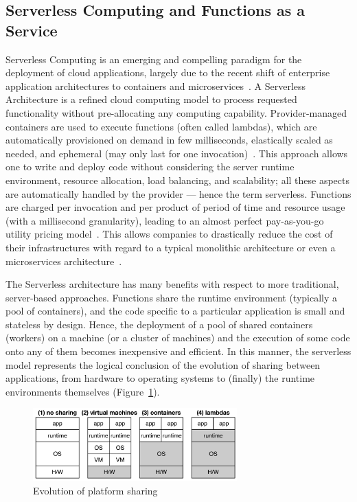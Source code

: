 \subsection{Serverless Computing and Functions as a Service}

Serverless Computing is an emerging and compelling paradigm for the deployment of cloud applications, largely due to the recent shift of enterprise application architectures to containers and microservices~\cite{baldini2017serverless}.  A Serverless Architecture is a refined cloud computing model to process requested functionality without pre-allocating any computing capability. Provider-managed containers are used to execute functions (often called lambdas), which are automatically provisioned on demand in few milliseconds, elastically scaled as needed, and ephemeral (may only last for one invocation)~\cite{Roberts:2016}. This approach allows one to write and deploy code without considering the server runtime
environment, resource allocation, load balancing, and scalability; all these aspects are automatically handled by the provider --- hence the term serverless. Functions are charged per invocation and per product of period of time and resource usage (with a millisecond granularity), leading to an almost perfect pay-as-you-go utility pricing model~\cite{MateosFaaster17}.  This allows companies to drastically reduce the cost of their infrastructures with regard to a typical monolithic architecture or even a microservices architecture~\cite{Villamizar2017lambda}.

The Serverless architecture has many benefits with respect to more traditional, server-based approaches. Functions share the runtime environment (typically a pool of containers), and the code specific to a particular application is small and stateless by design. Hence, the deployment of a pool of shared containers (workers) on a machine (or a cluster of machines) and the execution of some code onto any of them becomes inexpensive and efficient. In this manner, the serverless model represents the logical conclusion of the evolution of sharing between applications, from hardware to operating systems to (finally) the runtime environments themselves (Figure~\ref{fig:Evolution-of-Sharing}).

\begin{figure}
  \centering
    \includegraphics[width=0.7\textwidth]{figs/evolution-platform-sharing.png}    
    \caption{Evolution of platform sharing~\cite{Hendrickson:2016}}
    \label{fig:Evolution-of-Sharing}
\end{figure}


